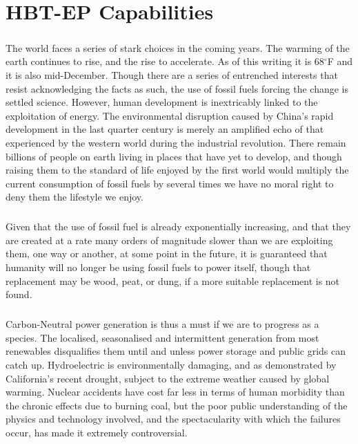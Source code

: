 \chapter{HBT-EP Capabilities}
\paragraph{} The world faces a series of stark choices in the coming years.  The warming of the earth continues to rise, and the rise to accelerate.  As of this writing it is 68$^{\circ}$F and it is also mid-December.  Though there are a series of entrenched interests that resist acknowledging the facts as such, the use of fossil fuels forcing the change is settled science.  However, human development is inextricably linked to the exploitation of energy.  The environmental disruption caused by China's rapid development in the last quarter century is merely an amplified echo of that experienced by the western world during the industrial revolution.  There remain billions of people on earth living in places that have yet to develop, and though raising them to the standard of life enjoyed by the first world would multiply the current consumption of fossil fuels by several times we have no moral right to deny them the lifestyle we enjoy.  
\paragraph{}
Given that the use of fossil fuel is already exponentially increasing, and that they are created at a rate many orders of magnitude slower than we are exploiting them, one way or another, at some point in the future, it is guaranteed that humanity will no longer be using fossil fuels to power itself, though that replacement may be wood, peat, or dung, if a more suitable replacement is not found.
\paragraph{}
Carbon-Neutral power generation is thus a must if we are to progress as a species.  The localised, seasonalised and intermittent generation from most renewables disqualifies them until and unless power storage and public grids can catch up.  Hydroelectric is environmentally damaging, and as demonstrated by California's recent drought, subject to the extreme weather caused by global warming.  Nuclear accidents have cost far less in terms of human morbidity than the chronic effects due to burning coal, but the poor public understanding of the physics and technology involved, and the spectacularity with which the failures occur, has made it extremely controversial.
